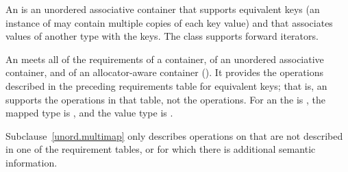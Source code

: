 \pnum
{}%
%
An  is an unordered associative container
that supports equivalent keys (an instance of  may contain
multiple copies of each key value) and that associates values of
another type  with the keys.
The  class
supports forward iterators.

\pnum
An  meets all of the requirements of a container, of an
unordered associative container, and of an allocator-aware container
(). It provides the operations described in the
preceding requirements table for equivalent keys; that is, an 
supports the  operations in that table, not the  operations.
For an  the  is , the
mapped type is , and the value type is .

\pnum
Subclause~\ref{unord.multimap} only describes operations on 
that are not described in one of the requirement tables, or for which
there is additional semantic information.

